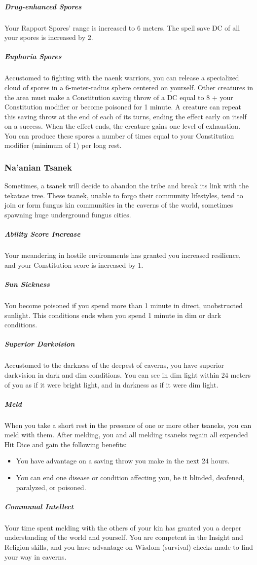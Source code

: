    \subparagraph{Drug-enhanced Spores} Your Rapport Spores' range is increased to 6 meters.
    The spell save DC of all your spores is increased by 2.

    \subparagraph{Euphoria Spores} Accustomed to fighting with the naenk warriors, you can release a specialized cloud of spores in a 6-meter-radius sphere centered on yourself.
    Other creatures in the area must make a Constitution saving throw of a DC equal to 8 + your Constitution modifier or become poisoned for 1 minute.
    A creature can repeat this saving throw at the end of each of its turns, ending the effect early on itself on a success.
    When the effect ends, the creature gains one level of exhaustion.
    You can produce these spores a number of times equal to your Constitution modifier (minimum of 1) per long rest.

\subsubsection{Na'anian Tsanek}
    Sometimes, a tsanek will decide to abandon the tribe and break its link with the tekatsae tree.
    These tsanek, unable to forgo their community lifestyles, tend to join or form fungus kin communities in the caverns of the world, sometimes spawning huge underground fungus cities.

    \subparagraph{Ability Score Increase} Your meandering in hostile environments has granted you increased resilience, and your Constitution score is increased by 1.

    \subparagraph{Sun Sickness} You become poisoned if you spend more than 1 minute in direct, unobstructed sunlight.
    This conditions ends when you spend 1 minute in dim or dark conditions.

    \subparagraph{Superior Darkvision} Accustomed to the darkness of the deepest of caverns, you have superior darkvision in dark and dim conditions.
    You can see in dim light within 24 meters of you as if it were bright light, and in darkness as if it were dim light.

    \subparagraph{Meld} \label{kin::tsanek.meld}
    When you take a short rest in the presence of one or more other tsaneks, you can meld with them.
    After melding, you and all melding tsaneks regain all expended Hit Dice and gain the following benefits:
    \begin{itemize}
        \item You have advantage on a saving throw you make in the next 24 hours.
        \item You can end one disease or condition affecting you, be it blinded, deafened, paralyzed, or poisoned.
    \end{itemize}

    \subparagraph{Communal Intellect} Your time spent melding with the others of your kin has granted you a deeper understanding of the world and yourself.
    You are competent in the Insight and Religion skills, and you have advantage on Wisdom (survival) checks made to find your way in caverns.

\newpage
